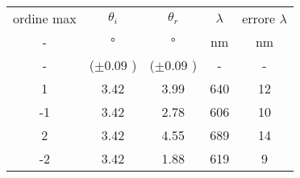 \begin{table}[H]
    \centering
    \begin{tabular}{|c|c|c|c c|}
    \hline
         ordine max	& $\theta_i$ & $\theta_r$ & $\lambda$ & errore $\lambda$\\
            -	&	°	&	°	&	nm	&	nm	\\
            -	& ($\pm 0.09$ ) & ($\pm 0.09$ ) & -	& -	\\
    \hline
            1	&	3.42	&	3.99	&	640	&	12	\\
            -1	&	3.42	&	2.78	&	606	&	10	\\
            2	&	3.42	&	4.55	&	689	&	14	\\
            -2	&	3.42	&	1.88	&	619	&	9	\\
    \hline
    \end{tabular}
\end{table}